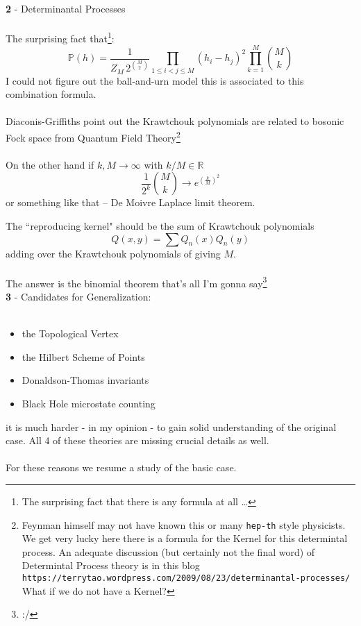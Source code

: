 \documentclass[12pt]{article}
\begin{document}
\noindent \textbf{2} - Determinantal Processes \\ \\
The surprising fact that\footnote{The surprising fact that there is any formula at all \dots}:
$$ \mathbb{P}(h)
= \frac{1}{Z_M \, 2^{\binom{M}{2}}} \prod_{1 \leq i < j \leq M}
(h_i - h_j)^2 \prod_{k=1}^M
\binom{M}{k}
 $$
I could not figure out the ball-and-urn model this is associated to this combination formula. \\ \\
Diaconis-Griffiths point out the Krawtchouk polynomials are related to bosonic Fock space from Quantum Field Theory\footnote{Feynman himself may not have known this or many \texttt{hep-th} style physicists.  We get very lucky here there is a formula for the Kernel for this determintal process.  An adequate discussion (but certainly not the final word) of Determintal Process theory is in this blog \texttt{https://terrytao.wordpress.com/2009/08/23/determinantal-processes/}  What if we do not have a Kernel?   } \\ \\
On the other hand if $k, M \to \infty$ with $k/M \in \mathbb{R}$ 
$$ \frac{1}{2^k} \binom{M}{k} \to e^{(\frac{k}{M})^2}$$
or something like that -- De Moivre Laplace limit theorem. \newpage

\noindent The ``reproducing kernel" should be the sum of Krawtchouk polynomials
$$ Q(x,y) = \sum Q_n(x) Q_n(y)$$
adding over the Krawtchouk polynomials of giving $M$.  \\ \\ 
The answer is the binomial theorem that's all I'm gonna say\footnote{:/} \\

\noindent \textbf{3} - Candidates for Generalization: \\\
\begin{itemize}
\item the Topological Vertex
\item the Hilbert Scheme of Points
\item Donaldson-Thomas invariants
\item Black Hole microstate counting
\end{itemize} 
\vspace{12pt}
it is much harder - in my opinion - to gain solid understanding of the original case.  All 4 of these theories are missing crucial details as well. \\ \\
For these reasons we resume a study of the basic case.
\end{document}
